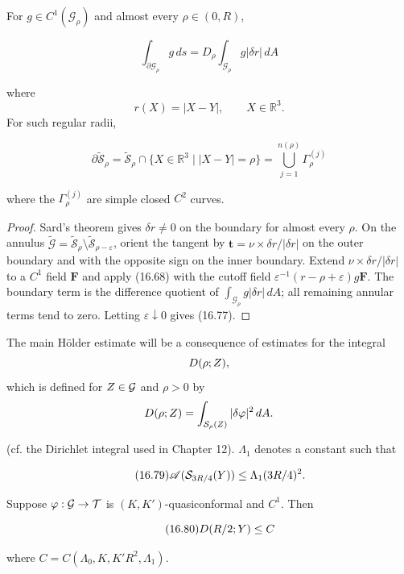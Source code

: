 \begin{lemma}
\label{gilbarg-trudinger.lem.16.surface-coarea}
For $g\in C^1(\mathcal G_\rho)$ and almost every $\rho\in(0,R)$,

\begin{equation}
\int_{\partial \mathcal G_\rho} g\, ds = D_\rho \int_{\mathcal G_\rho} g|\delta r|\, dA
\tag{16.77}
\end{equation}

where
\[
r(X) = |X - Y|, \qquad X \in \mathbb R^3.
\]
For such regular radii,

\begin{equation}\tag{16.78}
\partial \widetilde{\mathscr{S}}_{\rho}
= \widetilde{\mathscr{S}}_{\rho} \cap \{X \in \mathbb{R}^{3}\mid |X-Y|=\rho\}
= \bigcup_{j=1}^{n(\rho)} \Gamma_{\rho}^{(j)}
\end{equation}

where the $\Gamma_\rho^{(j)}$ are simple closed $C^2$ curves.
\end{lemma}
\begin{proof}
\sketch Sard's theorem gives $\delta r\ne0$ on the boundary for almost every
$\rho$.  On the annulus
$\widetilde{\mathscr G}=\widetilde{\mathscr S}_\rho
\setminus\widetilde{\mathscr S}_{\rho-\varepsilon}$, orient the tangent by
$\mathbf t=\nu\times\delta r/|\delta r|$ on the outer boundary and with
the opposite sign on the inner boundary.  Extend
$\nu\times\delta r/|\delta r|$ to a $C^1$ field $\mathbf F$ and apply
(16.68) with the cutoff field
$\varepsilon^{-1}(r-\rho+\varepsilon)g\mathbf F$.
The boundary term is the difference quotient of
$\int_{\mathcal G_\rho}g|\delta r|\,dA$; all remaining annular terms tend
to zero.  Letting $\varepsilon\downarrow0$ gives (16.77).
\end{proof}
The main H\"older estimate will be a consequence of estimates for the integral
\[
D(\rho; Z),
\]
which is defined for $Z \in \mathcal{G}$ and $\rho > 0$ by
\[
D(\rho; Z)=\int_{\mathcal{S}_{\rho}(Z)} |\delta \varphi|^2\, dA.
\]

(cf. the Dirichlet integral used in Chapter 12).
$\Lambda_1$ denotes a constant such that

\begin{equation}\tag{16.79}
\mathscr{A}(\mathcal{S}_{3R/4}(Y)) \le \Lambda_1 (3R/4)^2.
\end{equation}

\begin{lemma}\label{gilbarg-trudinger.lem.16.13.dirichlet-bound}
Suppose $\varphi:\mathcal{G}\to\mathcal{T}$ is $(K,K')$-quasiconformal and $C^1$. Then

\begin{equation}\tag{16.80}
D(R/2; Y) \le C
\end{equation}

where $C=C(\Lambda_0,K,K'R^2,\Lambda_1)$.
\end{lemma}

